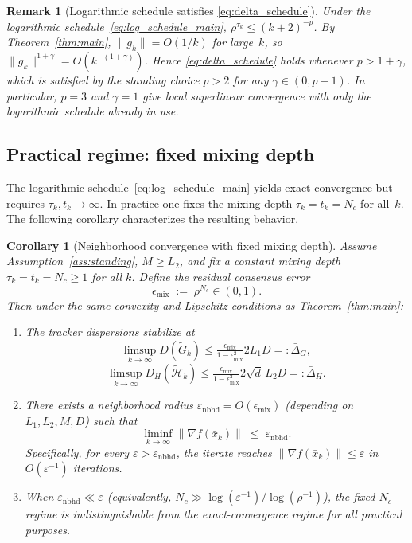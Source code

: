\documentclass[11pt,a4paper]{article}
\def\cO{O}%
\newtheorem{corollary}[theorem]{Corollary}
\newtheorem{remark}[theorem]{Remark}
\newcommand{\cO}{\mathcal{O}}
\begin{document}
\begin{remark}[Logarithmic schedule satisfies \eqref{eq:delta_schedule}]
Under the logarithmic schedule~\eqref{eq:log_schedule_main},
$\rho^{\tau_k}\le(k+2)^{-p}$.
By Theorem~\ref{thm:main}, $\|g_k\|=\cO(1/k)$ for large~$k$, so
$\|g_k\|^{1+\gamma}=\cO(k^{-(1+\gamma)})$.
Hence \eqref{eq:delta_schedule} holds whenever $p>1+\gamma$,
which is satisfied by the standing choice $p>2$ for any
$\gamma\in(0,p{-}1)$.
In particular, $p=3$ and $\gamma=1$ give local superlinear
convergence with only the logarithmic schedule already in use.
\end{remark}

\subsection{Practical regime: fixed mixing depth}\label{ssec:fixed_nc}

The logarithmic schedule~\eqref{eq:log_schedule_main} yields exact
convergence but requires $\tau_k,t_k\to\infty$.
In practice one fixes the mixing depth $\tau_k=t_k=N_c$ for all~$k$.
The following corollary characterizes the resulting behavior.

\begin{corollary}[Neighborhood convergence with fixed mixing depth]\label{cor:fixed_nc}
Assume Assumption~\ref{ass:standing}, $M\ge L_2$, and fix a constant mixing depth $\tau_k=t_k=N_c\ge 1$ for all $k$.
Define the residual consensus error
\[
\epsilon_{\mathrm{mix}} \;:=\; \rho^{N_c}\in(0,1).
\]
Then under the same convexity and Lipschitz conditions as Theorem~\ref{thm:main}:
\begin{enumerate}[leftmargin=1.2em,itemsep=2pt]
\item The tracker dispersions stabilize at
\[
\limsup_{k\to\infty} D(\tilde G_k)
\le \tfrac{\epsilon_{\mathrm{mix}}}{1-\epsilon_{\mathrm{mix}}^2}2L_1D
=: \bar\Delta_G,
\]
\[
\limsup_{k\to\infty} D_H(\tilde{\mathcal H}_k)
\le \tfrac{\epsilon_{\mathrm{mix}}}{1-\epsilon_{\mathrm{mix}}^2}2\sqrt{d}\,L_2D
=: \bar\Delta_H.
\]
\item There exists a neighborhood radius $\varepsilon_{\mathrm{nbhd}}=\cO(\epsilon_{\mathrm{mix}})$
(depending on $L_1,L_2,M,D$) such that
\[
\liminf_{k\to\infty}\|\nabla f(\bar x_k)\|\;\le\; \varepsilon_{\mathrm{nbhd}}.
\]
Specifically, for every $\varepsilon>\varepsilon_{\mathrm{nbhd}}$, the iterate reaches
$\|\nabla f(\bar x_k)\|\le \varepsilon$ in $\cO(\varepsilon^{-1})$ iterations.
\item When $\varepsilon_{\mathrm{nbhd}}\ll\varepsilon$
(equivalently, $N_c\gg \log(\varepsilon^{-1})/\log(\rho^{-1})$),
the fixed-$N_c$ regime is indistinguishable from the exact-convergence regime
for all practical purposes.
\end{enumerate}
\end{corollary}
\end{document}
